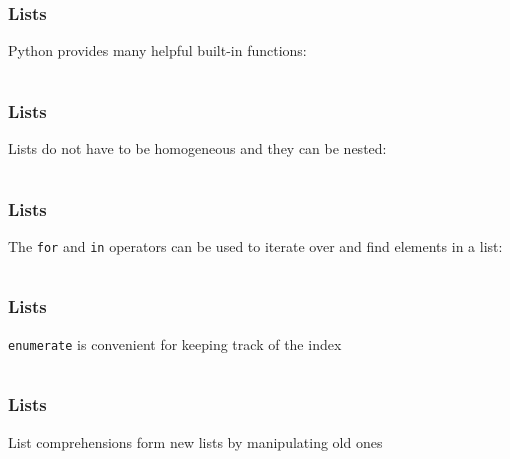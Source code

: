 \documentclass{beamer}
\begin{document}
\begin{frame}
\frametitle{Lists}
Python provides many helpful built-in functions:

\begin{center}
\begin{tabular}{c}

\end{tabular}
\end{center}

\end{frame}

\begin{frame}
\frametitle{Lists}

Lists do not have to be homogeneous and they can be nested:

\begin{center}
\begin{tabular}{c}

\end{tabular}
\end{center}

\end{frame}


\begin{frame}
\frametitle{Lists}

The \texttt{for} and \texttt{in} operators can be used to iterate over and find elements in a list:

\begin{center}
\begin{tabular}{c}

\end{tabular}
\end{center}

\end{frame}

\begin{frame}
\frametitle{Lists}

\texttt{enumerate} is convenient for keeping track of the index

\begin{center}
\begin{tabular}{c}

\end{tabular}
\end{center}

\end{frame}


\begin{frame}
\frametitle{Lists}

List comprehensions form new lists by manipulating old ones

\begin{center}
\begin{tabular}{c}

\end{tabular}
\end{center}

\end{frame}
\end{document}
